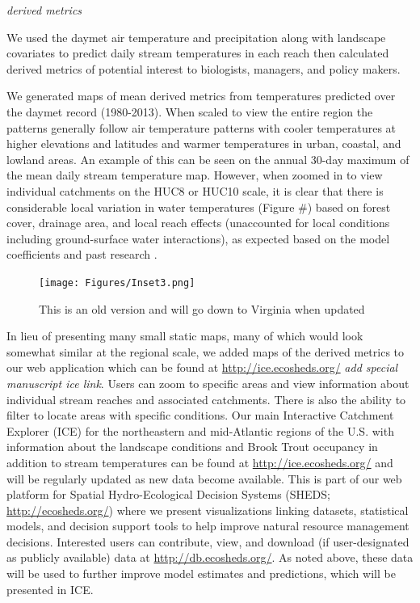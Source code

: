 \documentclass[]{article}
\begin{document}
\emph{derived metrics}

We used the daymet air temperature and precipitation along with
landscape covariates to predict daily stream temperatures in each reach
then calculated derived metrics of potential interest to biologists,
managers, and policy makers.

We generated maps of mean derived metrics from temperatures predicted
over the daymet record (1980-2013). When scaled to view the entire
region the patterns generally follow air temperature patterns with
cooler temperatures at higher elevations and latitudes and warmer
temperatures in urban, coastal, and lowland areas. An example of this
can be seen on the annual 30-day maximum of the mean daily stream
temperature map. However, when zoomed in to view individual catchments
on the HUC8 or HUC10 scale, it is clear that there is considerable local
variation in water temperatures (Figure \#) based on forest cover,
drainage area, and local reach effects (unaccounted for local conditions
including ground-surface water interactions), as expected based on the
model coefficients and past research \citep{Kanno2013}.

\begin{figure}[htbp]
\centering
\texttt{[image: Figures/Inset3.png]}
\caption{This is an old version and will go down to Virginia when
updated}
\end{figure}

In lieu of presenting many small static maps, many of which would look
somewhat similar at the regional scale, we added maps of the derived
metrics to our web application which can be found at
\url{http://ice.ecosheds.org/} \emph{add special manuscript ice link}.
Users can zoom to specific areas and view information about individual
stream reaches and associated catchments. There is also the ability to
filter to locate areas with specific conditions. Our main Interactive
Catchment Explorer (ICE) for the northeastern and mid-Atlantic regions
of the U.S. with information about the landscape conditions and Brook
Trout occupancy in addition to stream temperatures can be found at
\url{http://ice.ecosheds.org/} and will be regularly updated as new data
become available. This is part of our web platform for Spatial
Hydro-Ecological Decision Systems (SHEDS; \url{http://ecosheds.org/})
where we present visualizations linking datasets, statistical models,
and decision support tools to help improve natural resource management
decisions. Interested users can contribute, view, and download (if
user-designated as publicly available) data at
\url{http://db.ecosheds.org/}. As noted above, these data will be used
to further improve model estimates and predictions, which will be
presented in ICE.
\end{document}
